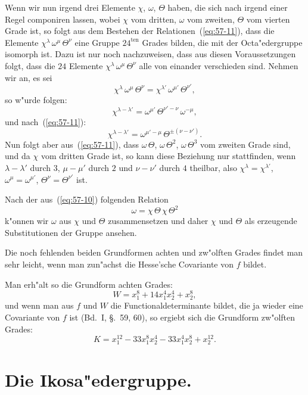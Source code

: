 \documentclass[12pt,a4paper]{article}
\theoremstyle{definition}
\begin{document}
Wenn wir nun irgend drei Elemente $\chi$, $\omega$, $\Theta$ haben, die sich nach irgend einer Regel componiren lassen, wobei $\chi$ vom dritten, $\omega$ vom zweiten, $\Theta$ vom vierten Grade ist, so folgt aus dem Bestehen der Relationen~(\ref{eq:57-11}), dass die Elemente $\chi^\lambda\,\omega^\mu\,\Theta^\nu$ eine Gruppe $24^{\text{ten}}$ Grades bilden, die mit der Octa"edergruppe isomorph ist. Dazu ist nur noch nachzuweisen, dass aus diesen Voraussetzungen folgt, dass die $24$ Elemente $\chi^\lambda\,\omega^\mu\,\Theta^\nu$ alle von einander verschieden sind. Nehmen wir an, es sei
\[
\chi^\lambda\,\omega^\mu\,\Theta^\nu = \chi^{\lambda'}\,\omega^{\mu'}\,\Theta^{\nu'},
\]
so w"urde folgen:
\[
\chi^{\lambda - \lambda'} = \omega^{\mu'}\,\Theta^{\nu' - \nu}\,\omega^{-\mu},
\]
und nach~(\ref{eq:57-11}):
\[
\chi^{\lambda - \lambda'} = \omega^{\mu' - \mu}\,\Theta^{\pm(\nu - \nu')}.
\]
Nun folgt aber aus~(\ref{eq:57-11}), dass $\omega\,\Theta$, $\omega\,\Theta^2$, $\omega\,\Theta^3$ vom zweiten Grade sind, und da $\chi$ vom dritten Grade ist, so kann diese Beziehung nur stattfinden, wenn $\lambda - \lambda'$ durch $3$, $\mu - \mu'$ durch $2$ und $\nu - \nu'$ durch $4$ theilbar, also $\chi^\lambda = \chi^{\lambda'}$, $\omega^\mu = \omega^{\mu'}$, $\Theta^\nu = \Theta^{\nu'}$ ist.

Nach der aus~(\ref{eq:57-10}) folgenden Relation
\[
\omega = \chi\,\Theta\,\chi\,\Theta^2
\]
k"onnen wir $\omega$ aus $\chi$ und $\Theta$ zusammensetzen und daher $\chi$ und $\Theta$ als erzeugende Substitutionen der Gruppe ansehen.

Die noch fehlenden beiden Grundformen achten und zw"olften Grades findet man sehr leicht, wenn man zun"achst die Hesse'sche Covariante von $f$ bildet.

Man erh"alt so die Grundform achten Grades:
\begin{equation}\label{eq:57-13}
W = x_1^8 + 14x_1^4 x_2^4 + x_2^8,
\end{equation}
und wenn man aus $f$ und $W$ die Functionaldeterminante bildet, die ja wieder eine Covariante von $f$ ist (Bd.~I, \S.~59, 60), so ergiebt sich die Grundform zw"olften Grades:
\begin{equation}\label{eq:57-14}
K = x_1^{12} - 33x_1^8 x_2^4 - 33x_1^4 x_2^8 + x_2^{12}.
\end{equation}


\section{Die Ikosa"edergruppe.}\label{sec:58}
\end{document}
